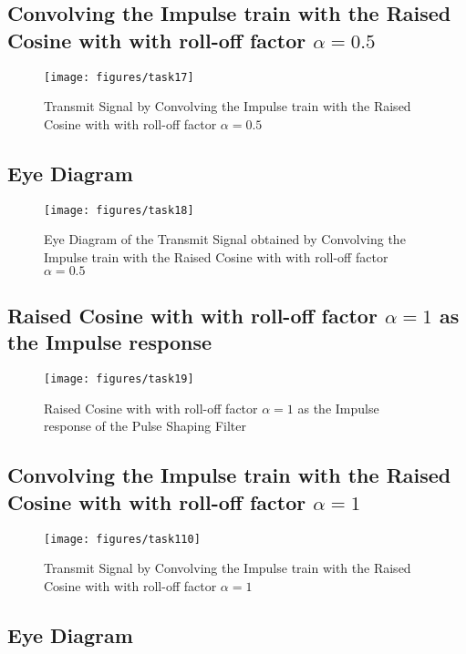\documentclass[a4paper,11pt]{article}%
\begin{document}
\subsection{Convolving the Impulse train with the Raised Cosine with with roll-off factor $\alpha = 0.5$}

\begin{figure}[H]
	\centering
	\texttt{[image: figures/task17]}
	\caption{Transmit Signal by Convolving the Impulse train with the Raised Cosine with with roll-off factor $\alpha = 0.5$}
\end{figure}

\subsection{Eye Diagram}

\begin{figure}[H]
	\centering
	\texttt{[image: figures/task18]}
	\caption{Eye Diagram of the Transmit Signal obtained by Convolving the Impulse train with the Raised Cosine with with roll-off factor $\alpha = 0.5$}
\end{figure}



\subsection{Raised Cosine with with roll-off factor $\alpha = 1$ as the Impulse response}



\begin{figure}[H]
	\centering
	\texttt{[image: figures/task19]}
	\caption{Raised Cosine with with roll-off factor $\alpha = 1$ as the Impulse response of the Pulse Shaping Filter}
\end{figure}

\subsection{Convolving the Impulse train with the Raised Cosine with with roll-off factor $\alpha = 1$}

\begin{figure}[H]
	\centering
	\texttt{[image: figures/task110]}
	\caption{Transmit Signal by Convolving the Impulse train with the Raised Cosine with with roll-off factor $\alpha = 1$}
\end{figure}

\subsection{Eye Diagram}
\end{document}
